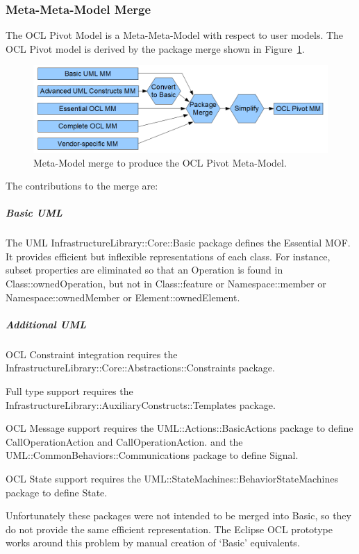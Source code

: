 \documentclass{eceasst}
\begin{document}
\subsubsection{Meta-Meta-Model Merge}

The OCL Pivot Model is a Meta-Meta-Model with respect to user models. The OCL Pivot model is derived by the package merge  shown in Figure~\ref{fig:UMLMMtoOCLMM}.

\begin{figure}
  \begin{center}
    \includegraphics[width=5.75in]{UMLMMtoOCLMM.png}
  \end{center}
  \caption{Meta-Model merge to produce the OCL Pivot Meta-Model.}
  \label{fig:UMLMMtoOCLMM}
\end{figure}

The contributions to the merge are:

\subparagraph{Basic UML}

The UML InfrastructureLibrary::Core::Basic package defines the Essential MOF. It provides efficient but inflexible representations of each class. For instance, subset properties are eliminated so that an Operation is found in Class::ownedOperation, but not in Class::feature or Namespace::member or Namespace::ownedMember or Element::ownedElement.

\subparagraph{Additional UML}

OCL Constraint integration requires the InfrastructureLibrary::Core::Abstractions::Constraints package.

Full type support requires the InfrastructureLibrary::AuxiliaryConstructs::Templates package.

OCL Message support requires the UML::Actions::BasicActions package to define CallOperationAction and CallOperationAction. and the UML::CommonBehaviors::Communications package to define Signal.

OCL State support requires the UML::StateMachines::BehaviorStateMachines package to define State.

Unfortunately these packages were not intended to be merged into Basic, so they do not provide the same efficient representation. The Eclipse OCL prototype works around this problem by manual creation of `Basic' equivalents.
\end{document}
